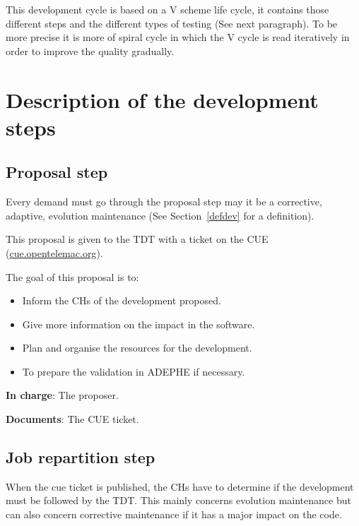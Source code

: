 This development cycle is based on a V scheme life cycle, it contains those
different steps and the different types of testing (See next paragraph). To be
more precise it is more of spiral cycle in which the V cycle is read
iteratively in order to improve the quality gradually.

\section{Description of the development steps}
\label{dev}

\subsection{Proposal step}

Every demand must go through the proposal step may it be a corrective,
adaptive, evolution maintenance (See Section~\ref{defdev} for a definition).

This proposal is given to the TDT with a ticket on the CUE
(\url{cue.opentelemac.org}).

The goal of this proposal is to:
\begin{itemize}
\item Inform the CHs of the development proposed.
\item Give more information on the impact in the software.
\item Plan and organise the resources for the development.
\item To prepare the validation in ADEPHE if necessary.
\end{itemize}

\textbf{In charge}: The proposer.

\textbf{Documents}: The CUE ticket.

\subsection{Job repartition step}

When the cue ticket is published, the CHs have to determine if the development
must be followed by the TDT\@. This mainly concerns evolution maintenance but
can also concern corrective maintenance if it has a major impact on the code.

